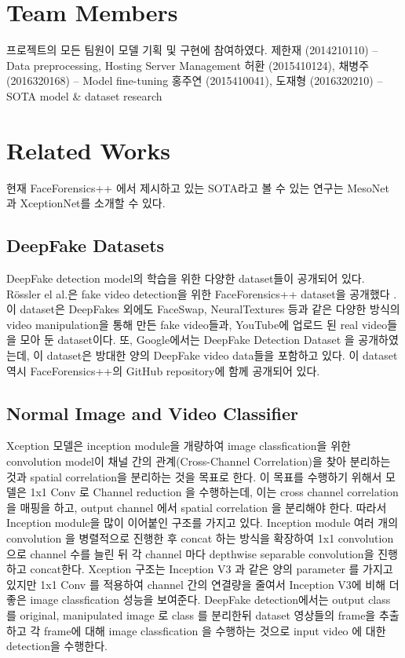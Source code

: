 \documentclass{article}
\begin{document}
	\section{Team Members}
	프로젝트의 모든 팀원이 모델 기획 및 구현에 참여하였다. \newline 
	제한재 (2014210110) -- Data preprocessing, Hosting Server Management\newline
	허환 (2015410124), 채병주 (2016320168) -- Model fine-tuning\newline
	홍주연 (2015410041), 도재형 (2016320210) -- SOTA model \& dataset research 
	\section{Related Works}
	
	현재 FaceForensics++ \cite{roessler2019faceforensicspp} 에서 제시하고 있는 SOTA라고 볼 수 있는 연구는 MesoNet\cite{darius2018MesoNet} 과 XceptionNet\cite{chollet2017xception}를 소개할 수 있다. 
	
		\subsection{DeepFake Datasets}
		DeepFake detection model의 학습을 위한 다양한 dataset들이 공개되어 있다. R\"ossler el al.은 fake video detection을 위한 FaceForensics++ dataset을 공개했다 \cite{roessler2019faceforensicspp}. 이 dataset은 DeepFakes 외에도 FaceSwap, NeuralTextures 등과 같은 다양한 방식의 video manipulation을 통해 만든 fake video들과, YouTube에 업로드 된 real video들을 모아 둔 dataset이다. 또, Google에서는 DeepFake Detection Dataset \cite{DDD_GoogleJigSaw2019} 을 공개하였는데, 이 dataset은 방대한 양의 DeepFake video data들을 포함하고 있다. 이 dataset 역시 FaceForensics++의 GitHub 
		repository에 함께 공개되어 있다.
		
		\subsection{Normal Image and Video Classifier}
		Xception 모델은 inception module을 개량하여 image classfication을 위한 convolution model이 채널 간의 관계(Cross-Channel Correlation)을 찾아 분리하는 것과 spatial correlation을 분리하는 것을 목표로 한다. 이 목표를 수행하기 위해서 모델은 1x1 Conv 로 Channel reduction 을 수행하는데, 이는 cross channel correlation을 매핑을 하고, output channel 에서 spatial correlation 을 분리해야 한다. 따라서 Inception module을 많이 이어붙인 구조를 가지고 있다. Inception module 여러 개의 convolution 을 병렬적으로 진행한 후 concat 하는 방식을 확장하여 1x1 convolution으로 channel 수를 늘린 뒤 각 channel 마다 depthwise separable convolution을 진행하고 concat한다. Xception 구조는 Inception V3 과 같은 양의 parameter 를 가지고 있지만 1x1 Conv 를 적용하여 channel 간의 연결량을 줄여서 Inception V3에 비해 더 좋은 image classfication 성능을 보여준다. DeepFake detection에서는 output class 를 original, manipulated image 로 class 를 분리한뒤 dataset 영상들의 frame을 추출하고 각 frame에 대해 image classfication 을 수행하는 것으로 input video 에 대한 detection을 수행한다.
		
\end{document}
